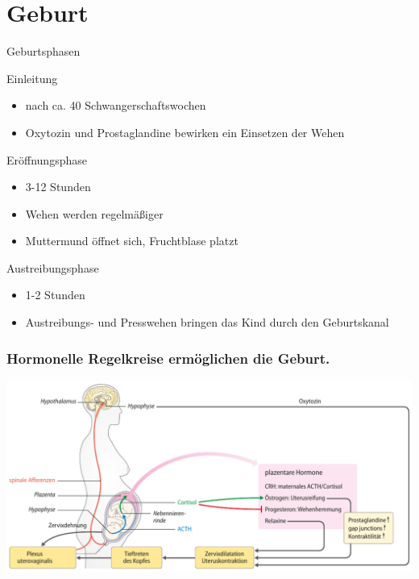 \documentclass{beamer}
\begin{document}
\section{Geburt}

\begin{frame}{Geburtsphasen}

\begin{block}{Einleitung}
\begin{itemize}
\item
nach ca.  40 Schwangerschaftswochen
\item
Oxytozin und Prostaglandine bewirken ein Einsetzen der Wehen
\end{itemize}
\end{block}

\pause

\begin{block}{Eröffnungsphase}
\begin{itemize}
\item
3-12 Stunden
\item
Wehen werden regelmäßiger
\item
Muttermund öffnet sich, Fruchtblase platzt
\end{itemize}
\end{block}

\pause

\begin{block}{Austreibungsphase}
\begin{itemize}
\item
1-2 Stunden
\item
Austreibungs- und Presswehen bringen das Kind durch den Geburtskanal
\end{itemize}
\end{block}


\end{frame}



\begin{frame}
\frametitle{Hormonelle Regelkreise ermöglichen die Geburt. }

\begin{center}
\includegraphics[width=\textwidth]{geburt_hormone}
\end{center}


\end{frame}
\end{document}
